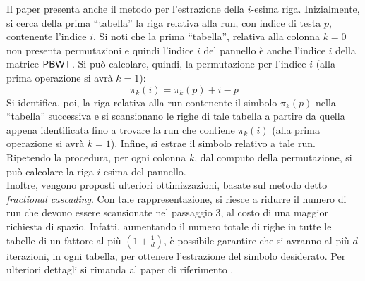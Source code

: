 Il paper presenta anche il metodo per l'estrazione della $i$-esima
riga. Inizialmente, si cerca della prima ``tabella'' la riga relativa alla run,
con indice di testa $p$, contenente l'indice $i$. Si noti che la prima
``tabella'', relativa alla colonna $k=0$ non presenta permutazioni e quindi  
l'indice $i$ del pannello è anche l'indice $i$ della matrice $\mbox{\rm {\sf PBWT}}$.
Si può calcolare, quindi, la permutazione per l'indice $i$ (alla prima
operazione si avrà $k=1$):
\begin{equation}
  \label{eq:pbwttrick2}
  \pi_k(i)=\pi_k(p)+i-p
\end{equation}
Si identifica, poi, la riga relativa alla run contenente il simbolo $\pi_k(p)$
nella ``tabella'' successiva e si scansionano le righe di tale tabella a
partire da quella appena identificata fino a trovare la run che contiene
$\pi_k(i)$ (alla prima
operazione si avrà $k=1$). Infine, si estrae il simbolo relativo a tale run.
Ripetendo la procedura, per ogni colonna $k$, dal computo della permutazione, si
può calcolare la riga $i$-esima del pannello.\\
Inoltre,
vengono proposti ulteriori ottimizzazioni, basate sul metodo detto
\textit{fractional cascading}. Con tale rappresentazione, si riesce a ridurre il
numero di run che devono essere scansionate nel passaggio 3, al costo di una
maggior richiesta di spazio. Infatti, aumentando il numero totale di
righe in tutte le tabelle di un fattore al più $\left(1+\frac{1}{d}\right)$, è
possibile garantire che si avranno al più $d$ iterazioni, in ogni tabella, per
ottenere l'estrazione del simbolo desiderato.
Per ulteriori dettagli si rimanda al paper di riferimento \cite{tricks}.
